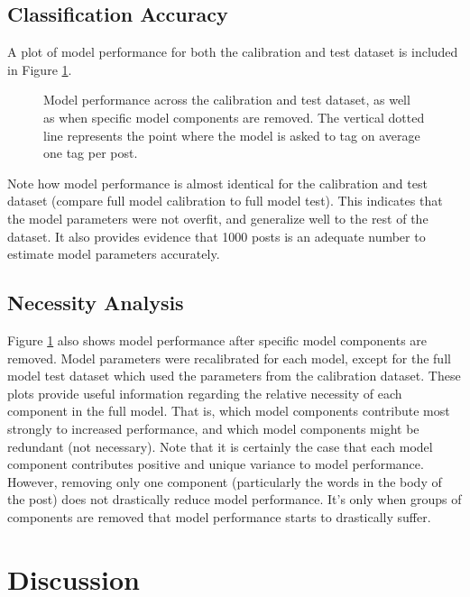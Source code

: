 \documentclass[10pt,letterpaper]{article}
\begin{document}
\subsection{Classification Accuracy}

A plot of model performance for both the calibration and test dataset is included in Figure \ref{fig:ROC}.

\begin{figure}[ht]
  \centering
  \caption{
    Model performance across the calibration and test dataset, as well as when specific model components are removed.
    The vertical dotted line represents the point where the model is asked to tag on average one tag per post.
  }
  \label{fig:ROC}
\end{figure}

Note how model performance is almost identical for the calibration and test dataset (compare full model calibration to full model test).
This indicates that the model parameters were not overfit, and generalize well to the rest of the dataset.
It also provides evidence that \num{1000} posts is an adequate number to estimate model parameters accurately.

\subsection{Necessity Analysis}

Figure \ref{fig:ROC} also shows model performance after specific model components are removed.
Model parameters were recalibrated for each model, except for the full model test dataset which used the parameters from the calibration dataset.
These plots provide useful information regarding the relative necessity of each component in the full model.
That is, which model components contribute most strongly to increased performance, and which model components might be redundant (not necessary).
Note that it is certainly the case that each model component contributes positive and unique variance to model performance.
However, removing only one component (particularly the words in the body of the post) does not drastically reduce model performance.
It's only when groups of components are removed that model performance starts to drastically suffer.

\section{Discussion}
\end{document}
